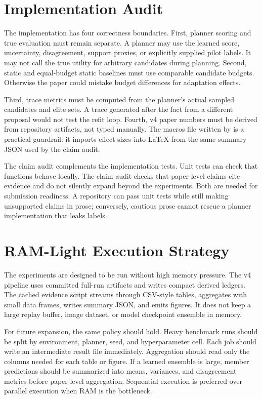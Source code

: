 \section{Implementation Audit}
\label{app:implementation-audit}

The implementation has four correctness boundaries. First, planner scoring and
true evaluation must remain separate. A planner may use the learned score,
uncertainty, disagreement, support proxies, or explicitly supplied pilot
labels. It may not call the true utility for arbitrary candidates during
planning. Second, static and equal-budget static baselines must use comparable
candidate budgets. Otherwise the paper could mistake budget differences for
adaptation effects.

Third, trace metrics must be computed from the planner's actual sampled
candidates and elite sets. A trace generated after the fact from a different
proposal would not test the refit loop. Fourth, v4 paper numbers must be
derived from repository artifacts, not typed manually. The macros file written
by  is a practical guardrail: it
imports effect sizes into \LaTeX{} from the same summary JSON used by the
claim audit.

The claim audit complements the implementation tests. Unit tests can check
that functions behave locally. The claim audit checks that paper-level claims
cite evidence and do not silently expand beyond the experiments. Both are
needed for submission readiness. A repository can pass unit tests while still
making unsupported claims in prose; conversely, cautious prose cannot rescue a
planner implementation that leaks labels.

\section{RAM-Light Execution Strategy}
\label{app:ram-strategy}

The experiments are designed to be run without high memory pressure. The v4
pipeline uses committed full-run artifacts and writes compact derived ledgers.
The cached evidence script streams through CSV-style tables, aggregates with
small data frames, writes summary JSON, and emits figures. It does not keep a
large replay buffer, image dataset, or model checkpoint ensemble in memory.

For future expansion, the same policy should hold. Heavy benchmark runs should
be split by environment, planner, seed, and hyperparameter cell. Each job
should write an intermediate result file immediately. Aggregation should read
only the columns needed for each table or figure. If a learned ensemble is
large, member predictions should be summarized into means, variances, and
disagreement metrics before paper-level aggregation. Sequential execution is
preferred over parallel execution when RAM is the bottleneck.

